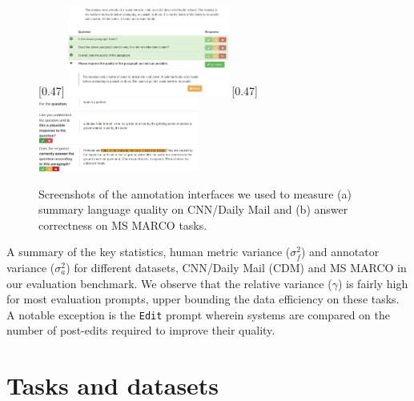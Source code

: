 \begin{figure}[t]
  \centering
  [0.47\linewidth]{%
    \includegraphics[width=0.47\textwidth]{figures/edit.png}
  }\hfill
  [0.47\linewidth]{%
    \includegraphics[width=0.47\textwidth]{figures/qa.png}
  }
  \caption{\label{fig:tasks} Screenshots of the annotation interfaces we used to measure (a) summary language quality on CNN/Daily Mail and (b) answer correctness on MS MARCO tasks.
  }
\end{figure}

\begin{table}[t]
  \centering
  
  \caption{\label{tab:dataset} A summary of the key statistics, human metric variance ($\sigma^2_f$) and annotator variance ($\sigma^2_a$) for different datasets, CNN/Daily Mail (CDM) and MS MARCO in our evaluation benchmark.
  We observe that the relative variance ($\gamma$) is fairly high for most evaluation prompts, upper bounding the data efficiency on these tasks.
  A notable exception is the \texttt{Edit} prompt wherein systems are compared on the number of post-edits required to improve their quality.
  }
\end{table}

\section{\label{sec:tasks} Tasks and datasets}

